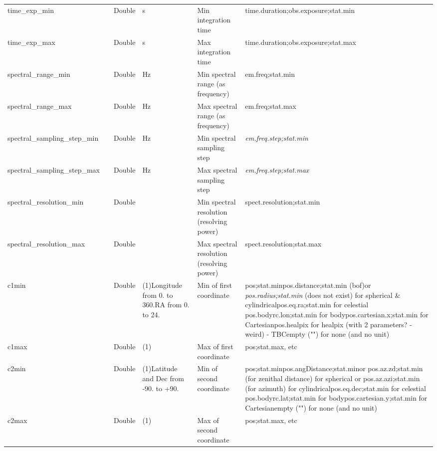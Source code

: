 \documentclass[11pt,a4paper]{ivoa}
\begin{document}
\begin{longtable}{p{3.5cm}p{0.5cm}p{1cm}p{1cm}p{7cm}p{3cm}}
time\_exp\_min&&Double&s&Min integration time&time.duration;obs.exposure;stat.min\\

time\_exp\_max&&Double&s&Max integration time&

time.duration;obs.exposure;stat.max\\


spectral\_range\_min&&Double&Hz&Min spectral range (as frequency)&em.freq;stat.min\\

spectral\_range\_max&&Double&Hz&Max spectral range (as frequency)&em.freq;stat.max\\

spectral\_sampling\_step\_min&&Double&Hz&Min spectral sampling step&\emph{em.freq.step;stat.min} \\

spectral\_sampling\_step\_max&&Double&Hz&Max spectral sampling step&\emph{em.freq.step;stat.max }\\

spectral\_resolution\_min&&Double&&Min spectral resolution (resolving power)&spect.resolution;stat.min\\

spectral\_resolution\_max&&Double&&Max spectral resolution (resolving power)&spect.resolution;stat.max\\

c1min&&Double&(1)Longitude from 0. to 360.RA from 0. to 24.&Min of first coordinate&pos;stat.minpos.distance;stat.min (bof)or \emph{pos.radius;stat.min} (does not exist)  for spherical \& cylindricalpos.eq.ra;stat.min for celestial pos.bodyrc.lon;stat.min for bodypos.cartesian.x;stat.min for Cartesianpos.healpix for healpix (with 2 parameters?  - weird) - TBCempty ("") for none (and no unit)\\

c1max&&Double&(1)&Max of first coordinate&pos;stat.max, etc\\

c2min&&Double&(1)Latitude and Dec from -90. to +90.&Min of second coordinate&pos;stat.minpos.angDistance;stat.minor pos.az.zd;stat.min (for zenithal distance) for spherical or pos.az.azi;stat.min (for azimuth)  for cylindricalpos.eq.dec;stat.min for celestial pos.bodyrc.lat;stat.min for bodypos.cartesian.y;stat.min for Cartesianempty ("") for none (and no unit)\\

c2max&&Double&(1)&Max of second coordinate&pos;stat.max, etc\\


\end{longtable}
\end{document}
